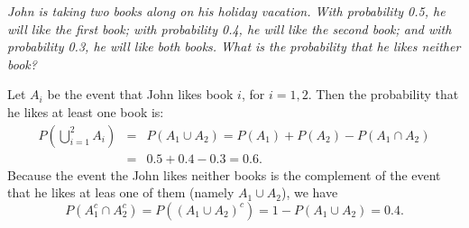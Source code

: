 \documentclass[notes=show,handout]{beamer}\usepackage[]{graphicx}\usepackage[]{color}
\newcommand{\bea}{\begin{eqnarray}}
\newcommand{\eea}{\end{eqnarray}}
\newcommand{\nn}{\nonumber}
\begin{document}
\begin{frame}{\secname}

  \begin{example}
  \begin{small}
  \textit{John is taking two books along on his holiday vacation. With probability 0.5, he will like the first book; with probability 0.4, he will like the
  second book; and with probability 0.3, he will like both books. What is the probability that he likes neither book?}

  \vspace{0.2cm}

  \begin{footnotesize}
  Let $A_i$ be the event that John likes book $i$, for $i=1,2$. Then the probability that he likes at least one book is:
  \bea
  P(\bigcup_{i=1}^2 A_i) &=& P(A_1 \cup A_2) = P(A_1) + P(A_2) - P(A_1\cap A_2) \nn \\
  &=& 0.5 + 0.4 -0.3 =0.6. \nn
  \eea
  Because the event the John likes neither books is the complement of the event that he likes at leas one of them (namely $A_1 \cup A_2$), we have
  $$
  P(A^{c}_1 \cap A^{c}_2 ) = P((A_1 \cup A_2)^c) = 1- P (A_1 \cup A_2) = 0.4.
  $$
  \end{footnotesize}
  \end{small}
  \end{example}
\end{frame}
\end{document}

